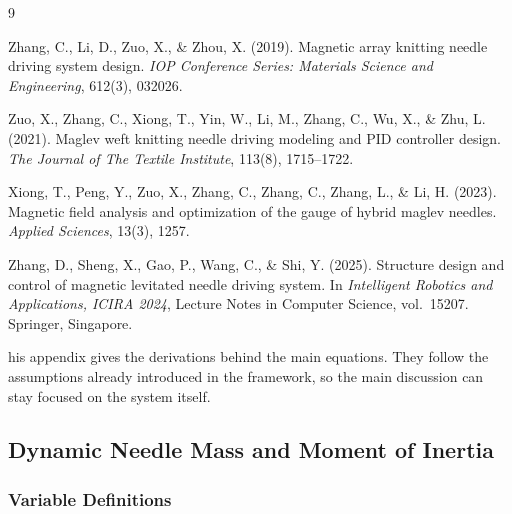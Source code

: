 \documentclass[12pt, a4paper]{article}
\begin{document}
\begingroup
\renewcommand{\section}[2]{}
\begin{thebibliography}{9}

Zhang, C., Li, D., Zuo, X., \& Zhou, X. (2019).
Magnetic array knitting needle driving system design.
\textit{IOP Conference Series: Materials Science and Engineering},
612(3), 032026.

Zuo, X., Zhang, C., Xiong, T., Yin, W., Li, M., Zhang, C., Wu, X., \& Zhu, L. (2021).
Maglev weft knitting needle driving modeling and PID controller design.
\textit{The Journal of The Textile Institute}, 113(8), 1715--1722.

Xiong, T., Peng, Y., Zuo, X., Zhang, C., Zhang, C., Zhang, L., \& Li, H. (2023).
Magnetic field analysis and optimization of the gauge of hybrid maglev needles.
\textit{Applied Sciences}, 13(3), 1257.

Zhang, D., Sheng, X., Gao, P., Wang, C., \& Shi, Y. (2025).
Structure design and control of magnetic levitated needle driving system.
In \textit{Intelligent Robotics and Applications, ICIRA 2024},
Lecture Notes in Computer Science, vol.\ 15207. Springer, Singapore.

\end{thebibliography}
\endgroup

\appendix

\section{Mathematical Derivations}

This appendix gives the derivations behind the main equations. They follow the assumptions already introduced in the framework, so the main discussion can stay focused on the system itself.

\subsection{Dynamic Needle Mass and Moment of Inertia}

\subsubsection*{Variable Definitions}
\end{document}
